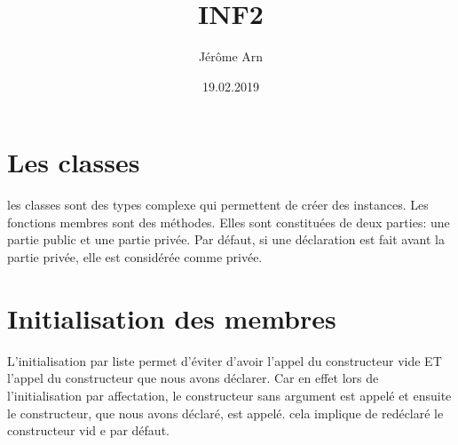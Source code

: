\documentclass{article}
\title{INF2}
\author{Jérôme Arn}
\date{19.02.2019}
\begin{document}
\maketitle
\newpage

\tableofcontents
\newpage
\section{Les classes}
les classes sont des types complexe qui permettent de créer des instances. Les fonctions membres sont des méthodes. Elles sont constituées de deux parties: une partie public et une partie privée. Par défaut, si une déclaration est fait avant la partie privée, elle est considérée comme privée. 
\section{Initialisation des membres}
L'initialisation par liste permet d'éviter d'avoir l'appel du constructeur vide ET l'appel du constructeur que nous avons déclarer. Car en effet lors de l'initialisation par affectation, le constructeur sans argument est appelé et ensuite le constructeur, que nous avons déclaré, est appelé. cela implique de redéclaré le constructeur vid e par défaut. 
\end{document}
